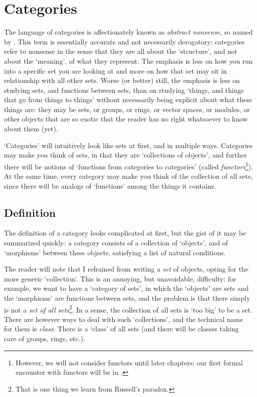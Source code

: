 \section{Categories}%
\label{sec:prelims:categories}

The language of categories is affectionately known as \emph{abstract
  nonsense}, so named by . This term is
essentially accurate and not necessarily derogatory: categories refer
to nonsense in the sense that they are all about the `structure', and
not about the `meaning', of what they represent.  The emphasis is less
on how you run into a specific set you are looking at and more on how
that set may sit in relationship with all other sets. Worse (or
better) still, the emphasis is less on studying sets, and functions
between sets, than on studying `things, and things that go from things
to things' without necessarily being explicit about what these things
are: they may be sets, or groups, or rings, or vector spaces, or
modules, or other objects that are so exotic that the reader has no
right whatsoever to know about them (yet).

`Categories' will intuitively look like sets at first, and in multiple
ways.  Categories may make you think of sets, in that they are
`collections of objects', and further there will be notions of
`functions from categories to categories' (called
\emph{functors}\footnote{However, we will not consider functors until
  later chapters: our first formal encounter with functors will be in
  .}). At the same time, every category may make
you think of the collection of all sets, since there will be analogs
of `functions' among the things it contains.

\subsection{Definition}%
\label{subsec:prelims:categories:definition}

The definition of a category looks complicated at first, but the gist
of it may be summarized quickly: a category consists of a collection
of `objects', and of `morphisms' between these objects, satisfying a
list of natural conditions.

The reader will note that I refrained from writing a \emph{set} of
objects, opting for the more generic `collection'. This is an
annoying, but unavoidable, difficulty: for example, we want to have a
`category of sets', in which the `objects' are sets and the
`morphisms' are functions between sets, and the problem is that there
simply is not a \emph{set of all sets}\footnote{That is one thing we
  learn from Russell's paradox.}. In a sense, the collection of all
sets is `too big' to be a set. There are however ways to deal with
such `collections', and the technical name for them is \emph{class}.
There is a `class' of all sets (and there will be classes taking care
of groups, rings, etc.).

